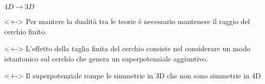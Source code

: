 \documentclass[10pt,compress]{beamer}
\begin{document}
\begin{frame}{$4D \rightarrow 3D$ }
\begin{block}{}<+->
Per mantere la dualità tra le teorie è necessario mantenere il raggio del cerchio finito.\\
\end{block}
\begin{block}{}<+->
L'effetto della taglia finita del cerchio consiste nel considerare un modo istantonico sul cerchio che genera un superpotenziale aggiuntivo.
\end{block}
\begin{block}{}<+->
Il superpotenziale rompe le simmetrie in 3D che non sono simmetrie in 4D 
\end{block}

\end{frame}








\nocite{*}


\end{document}
